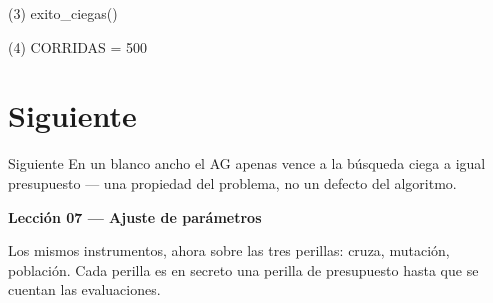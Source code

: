 \begin{frame}[fragile]{(3) exito\_ciegas()}

\end{frame}

\begin{frame}[fragile]{(4) CORRIDAS = 500}

\end{frame}


\section{Siguiente}

\begin{frame}{Siguiente}
En un blanco ancho el AG apenas vence a la búsqueda ciega a igual presupuesto --- una propiedad del problema, no un defecto del algoritmo.

\vspace{0.8em}
\textbf{Lección 07 --- Ajuste de parámetros}

Los mismos instrumentos, ahora sobre las tres perillas: cruza, mutación, población. Cada perilla es en secreto una perilla de presupuesto hasta que se cuentan las evaluaciones.
\end{frame}

